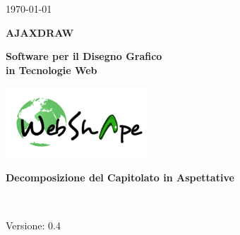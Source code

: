 \usepackage{multirow}


\renewcommand{\insertversion}{0.4} %
\renewcommand{\TITOLODOC}{Decomposizione del Capitolato in Aspettative} %

\begin{titlepage}
\begin{center}
	\begin{Large}	\today \end{Large}
\end{center}

\vspace{20pt}

\begin{center}
	\begin{Huge}
				\textbf{AJAXDRAW}
	\end{Huge}
\end{center}			

\begin{center}
	\begin{large}
				\textbf{Software per il Disegno Grafico\\ in Tecnologie Web}
	\end{large}
\end{center}			

\vspace{20pt}

\begin{center}
\includegraphics[width=150pt]{logo}
\end{center}

\vspace{160pt}
\begin{center} %
	\begin{Huge}
				\textbf{\TITOLODOC}
	\end{Huge}
			\\
\end{center}
\vspace{100pt}
\begin{center}
Versione: \insertversion
\end{center}
\end{titlepage}

